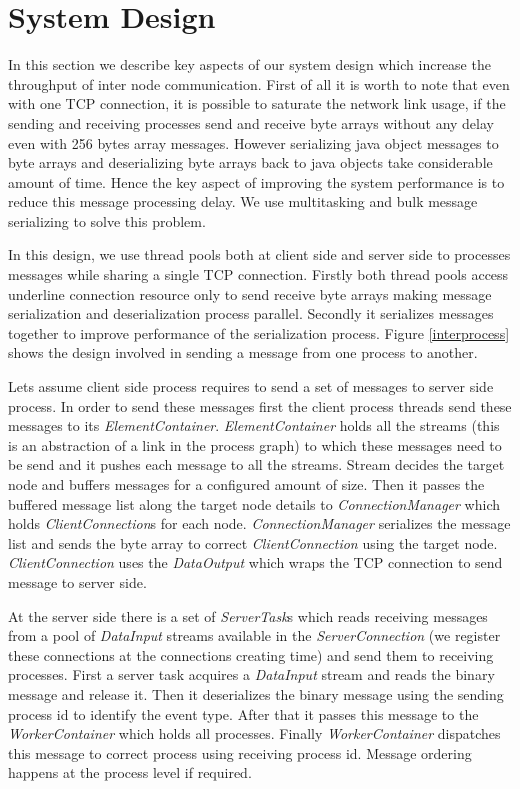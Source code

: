 \section{System Design}
In this section we describe key aspects of our system design which increase the throughput of inter node communication. First of all it is worth to note that even with one TCP connection, it is possible to saturate the network link usage, if the sending and receiving processes send and receive byte arrays without any delay even with 256 bytes array messages. However serializing java object messages to byte arrays and deserializing byte arrays back to java objects take considerable amount of time. Hence the key aspect of  improving the system performance is to reduce this message processing delay. We use multitasking and bulk message serializing to solve this problem. 

In this design, we use thread pools both at client side and server side to processes messages while sharing a single TCP connection. Firstly both thread pools access underline connection resource only to send receive byte arrays making message serialization and deserialization process parallel. Secondly it serializes messages together to improve performance of the serialization process.  Figure \ref{interprocess} shows the design involved in sending a message from one process to another. 

Lets assume client side process requires to send a set of messages to server side process. In order to send these messages first the client process threads send these messages to its \textit{ElementContainer}. \textit{ElementContainer} holds all the streams (this is an abstraction of a link in the process graph) to which these messages need to be send and it pushes each message to all the streams. Stream decides the target node and buffers messages for a configured amount of size. Then it passes the buffered  message list along the target node details to \textit{ConnectionManager} which holds \textit{ClientConnection}s for each node. \textit{ConnectionManager} serializes the message list and sends the byte array to correct \textit{ClientConnection} using the target node. \textit{ClientConnection} uses the \textit{DataOutput} which wraps the TCP connection to send message to server side. 

At the server side there is a set of \textit{ServerTask}s which reads receiving messages from a pool of \textit{DataInput} streams available in the \textit{ServerConnection} (we register these connections at the connections creating time) and send them to receiving processes. First a server task acquires a \textit{DataInput} stream and reads the binary message and release it. Then it deserializes the binary message using the sending process id to identify the event type.  After that it passes this message to the \textit{WorkerContainer} which holds all processes. Finally \textit{WorkerContainer} dispatches this message to correct process using receiving process id. Message ordering happens at the process level if required. 

